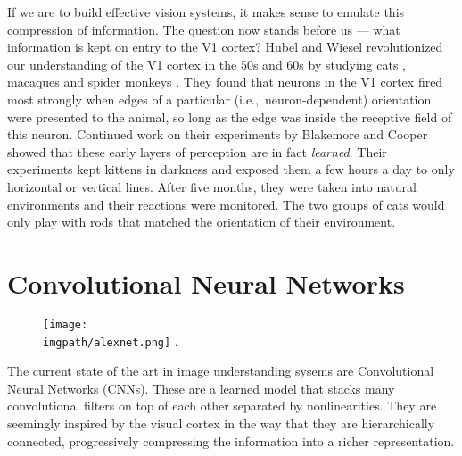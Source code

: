 If we are to build effective vision systems, it makes sense to emulate this
compression of information.
The question now stands before us --- what information is kept on entry to the V1 cortex?
Hubel and Wiesel revolutionized our understanding of the V1 cortex in the 50s and 60s by 
studying cats \cite{hubel_receptive_1959, hubel_receptive_1962}, macaques and spider 
monkeys \cite{hubel_receptive_1968}. They found that neurons in the V1 cortex fired
most strongly when edges of a particular (i.e.,\ neuron-dependent) orientation
were presented to the animal, so long as the edge was inside the receptive field of
this neuron.
Continued work on their experiments by Blakemore and Cooper
\cite{blakemore_development_1970} showed that these early layers of perception
are in fact \emph{learned}. Their experiments kept kittens in darkness and exposed
them a few hours a day to only horizontal or vertical lines. After five months, they were
taken into natural environments and their reactions were monitored. The two groups of cats
would only play with rods that matched the orientation of their environment.

\section{Convolutional Neural Networks}
\begin{figure}
  \centering
    \texttt{[image: \\imgpath/alexnet.png]}
    .
    \label{fig:ch1:cnn_arch}
  \end{figure}
The current state of the art in image understanding sysems are 
Convolutional Neural Networks (CNNs). These are a learned model that
stacks many convolutional filters on top of each other separated by
nonlinearities. 
They are seemingly inspired by the visual cortex in the way that they are
hierarchically connected, progressively compressing the information into a
richer representation. 

